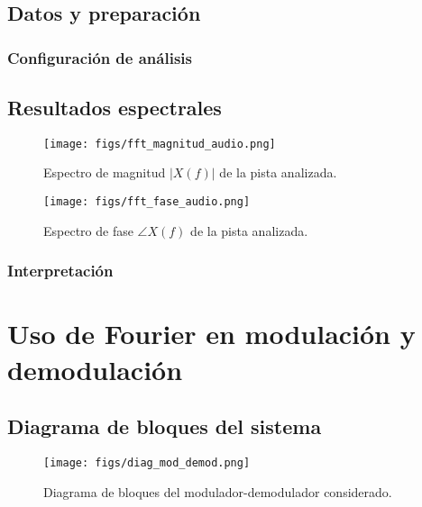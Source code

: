 \documentclass[letter,12pt]{article}
\begin{document}
\subsection{Datos y preparación}
\subsubsection{Configuración de análisis}
\subsection{Resultados espectrales}
\begin{figure}[H]
  \centering
  \texttt{[image: figs/fft\_magnitud\_audio.png]} %
  \caption{Espectro de magnitud $\lvert X(f)\rvert$ de la pista analizada.}
  \label{fig:fft-mag-audio}
\end{figure}
\begin{figure}[H]
  \centering
  \texttt{[image: figs/fft\_fase\_audio.png]} %
  \caption{Espectro de fase $\angle X(f)$ de la pista analizada.}
  \label{fig:fft-fase-audio}
\end{figure}
\subsubsection{Interpretación}

\section{Uso de Fourier en modulación y demodulación}
\subsection{Diagrama de bloques del sistema}
\begin{figure}[H]
  \centering
  \texttt{[image: figs/diag\_mod\_demod.png]} %
  \caption{Diagrama de bloques del modulador-demodulador considerado.}
  \label{fig:bloques-mod-demod}
\end{figure}
\end{document}

